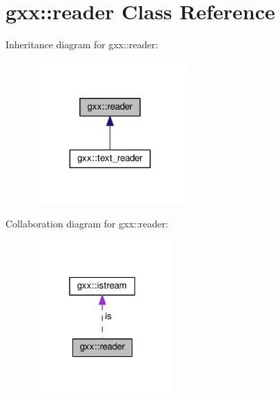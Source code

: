 \hypertarget{classgxx_1_1reader}{}\section{gxx\+:\+:reader Class Reference}
\label{classgxx_1_1reader}


Inheritance diagram for gxx\+:\+:reader\+:
\nopagebreak
\begin{figure}[H]
\begin{center}
\leavevmode
\includegraphics[width=167pt]{classgxx_1_1reader__inherit__graph}
\end{center}
\end{figure}


Collaboration diagram for gxx\+:\+:reader\+:
\nopagebreak
\begin{figure}[H]
\begin{center}
\leavevmode
\includegraphics[width=151pt]{classgxx_1_1reader__coll__graph}
\end{center}
\end{figure}
